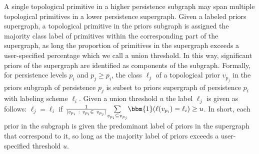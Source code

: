 A single topological primitive in a higher persistence subgraph may span multiple topological primitives in a lower persistence supergraph.  Given a labeled priors supergraph, a topological primitive in the priors subgraph is assigned the majority class label of primitives within the corresponding part of the supergraph, as long the proportion of primitives in the supergraph exceeds a user-specified percentage which we call a union threshold. 
In this way, significant priors of the supergraph are identified as components of the subgraph.  Formally, for persistence levels $p_i$ and $p_j \geq p_i$, the class  $\ell_j$ of a topological prior $v_{p_j}$ in the priors subgraph of persistence $p_j$ is subset to priors supergraph of persistence $p_i$ with labeling scheme $\ell_i$.  Given a union threshold $u$ the label $\ell_j$ is given as follows: 
$\ell_j = \ell_i$ if $ \frac{1}{|v_{p_i}~:~v_{p_i}\in~v_{p_j}|}\underset{v_{p_i} \subseteq v_{p_j}}{\sum} \bbm{1} ( \ell(v_{p_i}) = \ell_i) \geq u$. In short, each prior in the subgraph is given the predominant label of priors in the supergraph that correspond to it, so long as the majority label of priors exceeds a user-specified threshold $u$. 

